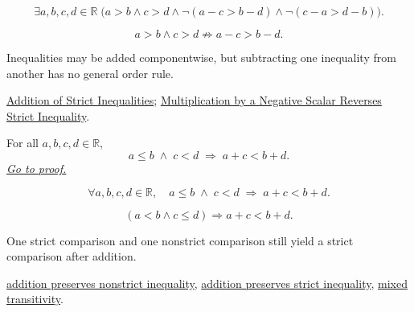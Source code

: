 \begin{remark*}
\[
\exists a,b,c,d\in\mathbb{R}\;
\bigl(a>b\land c>d\land \neg(a-c>b-d)\land\neg(c-a>d-b)\bigr).
\]
\end{remark*}

\begin{remark*}
\[
a>b\land c>d\nRightarrow a-c>b-d.
\]
\end{remark*}

\begin{remark*}[Interpretation]
Inequalities may be added componentwise, but subtracting one inequality from
another has no general order rule.
\end{remark*}

\begin{dependencies}
\hyperref[thm:ineq-add-inequalities]{Addition of Strict Inequalities};
\hyperref[thm:ineq-multiply-negative]{Multiplication by a Negative Scalar Reverses Strict Inequality}.
\end{dependencies}


\begin{theorem}
\label{thm:ineq-mixed-add}
For all $a, b, c, d \in \mathbb{R}$,
\[
  a \le b \;\land\; c < d \;\Rightarrow\; a + c < b + d.
\]
\hyperref[prf:ineq-mixed-add]{\textit{Go to proof.}}
\end{theorem}



\begin{remark*}
\[
  \forall a, b, c, d \in \mathbb{R},\quad
  a \le b \;\land\; c < d \;\Rightarrow\; a + c < b + d.
\]
\end{remark*}

\begin{remark*}
\[
(a<b\land c\le d)\Rightarrow a+c<b+d.
\]
\end{remark*}

\begin{remark*}[Interpretation]
One strict comparison and one nonstrict comparison still yield a strict comparison after addition.
\end{remark*}

\begin{dependencies}
\hyperref[thm:ineq-nonstrict-add-both-sides]{addition preserves nonstrict inequality},
\hyperref[thm:ineq-add-both-sides]{addition preserves strict inequality},
\hyperref[thm:ineq-transitivity-mixed]{mixed transitivity}.
\end{dependencies}

